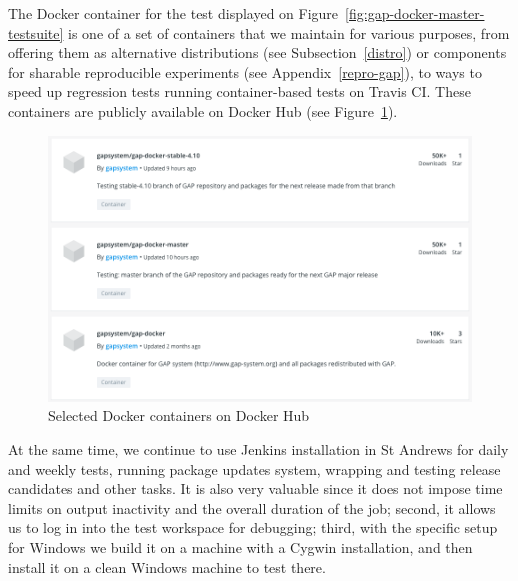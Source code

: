 The Docker container for the test displayed on Figure~\ref{fig:gap-docker-master-testsuite}
is one of a set of containers that we maintain for various purposes, from offering 
them as alternative distributions (see Subsection~\ref{distro}) or components for sharable
reproducible experiments (see Appendix~\ref{repro-gap}), to ways to speed up regression tests running
container-based tests on Travis CI. These containers are publicly available on Docker Hub
(see Figure~\ref{fig:gap-docker}).

\begin{figure}[!ht]
    \centering
    \includegraphics[width=12cm]{images/gap-docker}
    \caption{Selected \GAP Docker containers on Docker Hub}
    \label{fig:gap-docker}
\end{figure}

At the same time, we continue to use Jenkins installation in St Andrews 
for daily and weekly tests, running package updates system, wrapping and
testing release candidates and other tasks. It is also very valuable since 
it does not impose time limits on output inactivity and the overall duration
of the job; second, it allows us to log in into the test workspace for
debugging; third, with the specific \GAP setup for Windows we build it on a
machine with a Cygwin installation, and then install it on a clean Windows
machine to test there. 
